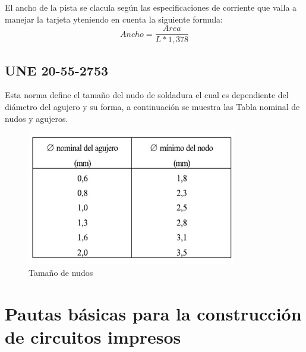 \documentclass[a4paper,12pt,twoside]{proyectotanquesecci}
\begin{document}
El ancho de la pista se clacula según las especificaciones de corriente que valla a manejar la tarjeta yteniendo en cuenta la siguiente formula:
\begin{equation}
Ancho=\frac{Area}{L*1,378}
\label{Ecu 2}
\end{equation}

\subsection{UNE 20-55-2753}
Esta norma define el tamaño del nudo de soldadura el cual es dependiente del  diámetro del agujero  y su forma, a continuación se muestra las Tabla nominal de nudos y agujeros.

\begin{figure}[h]
\centering
\includegraphics[scale=0.8]{Tabla2.jpg}
\renewcommand{\figurename}{Fig.}
\caption{Tamaño de nudos}
\label{Tamaño de nudos}
\end{figure}

\section{Pautas básicas para la construcción de circuitos impresos}
\end{document}

